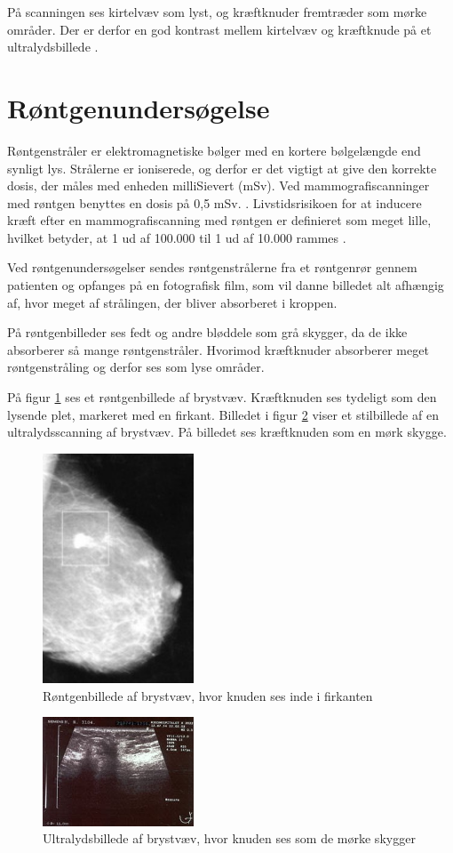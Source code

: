 På scanningen ses kirtelvæv som lyst, og kræftknuder fremtræder som mørke områder.  Der er derfor en god kontrast mellem kirtelvæv og kræftknude på et ultralydsbillede \citep{Ultralyd}.

\section{Røntgenundersøgelse}
Røntgenstråler er elektromagnetiske bølger med en kortere bølgelængde end synligt lys. Strålerne er ioniserede, og derfor er det vigtigt at give den korrekte dosis, der måles med enheden milliSievert (mSv). Ved mammografiscanninger med røntgen benyttes en dosis på 0,5 mSv. \cite{Sundhedsstyrelsen}. Livstidsrisikoen for at inducere kræft efter en mammografiscanning med røntgen er definieret som meget lille, hvilket betyder, at 1 ud af 100.000 til 1 ud af 10.000 rammes \cite{Risk}. 

Ved røntgenundersøgelser sendes røntgenstrålerne fra et røntgenrør gennem patienten og opfanges på en fotografisk film, som vil danne billedet alt afhængig af, hvor meget af strålingen, der bliver absorberet i kroppen. \cite{Rontgenundersogelse}

På røntgenbilleder ses fedt og andre bløddele som grå skygger, da de ikke absorberer så mange røntgenstråler. Hvorimod kræftknuder absorberer meget røntgenstråling og derfor ses som lyse områder. \cite{Rontgenundersogelse}

På figur \ref{rontgen} ses et røntgenbillede af brystvæv. Kræftknuden ses tydeligt som den lysende plet, markeret med en firkant. Billedet i figur \ref{ultralyd} viser et stilbillede af en ultralydsscanning af brystvæv. På billedet ses kræftknuden som en mørk skygge. 

\begin{figure}[H]
    \centering
    \includegraphics[width=0.40\textwidth]{figurer/r/rontgen}
    \caption{Røntgenbillede af brystvæv, hvor knuden ses inde i firkanten \cite{Mammografi}}
    \label{rontgen}
\end{figure}


\begin{figure}[H]
    \centering
    \includegraphics[width=0.40\textwidth]{figurer/r/ultra}
    \caption{Ultralydsbillede af brystvæv, hvor knuden ses som de mørke skygger \cite{Ultralyd}}
    \label{ultralyd}
\end{figure}